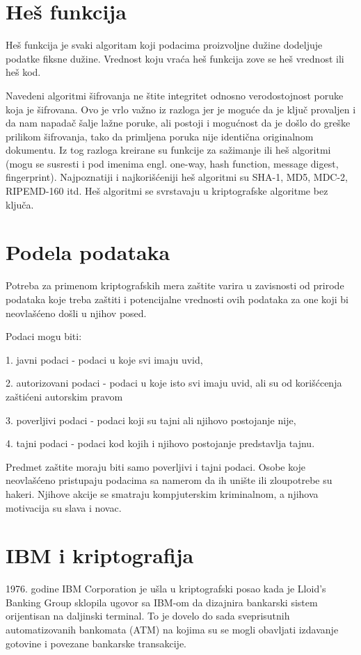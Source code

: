 \documentclass[a4paper]{article}
\begin{document}
\section{Heš funkcija}
\label{sec:heš_funkcija}
Heš funkcija je svaki algoritam koji podacima proizvoljne dužine dodeljuje podatke fiksne dužine. Vrednost koju vraća heš funkcija zove se heš vrednost ili heš kod.

Navedeni algoritmi šifrovanja ne štite integritet odnosno verodostojnost poruke koja je šifrovana. Ovo je vrlo važno iz razloga jer je moguće da je ključ provaljen i da nam napadač šalje lažne poruke, ali postoji i mogućnost da je došlo do greške prilikom šifrovanja, tako da primljena poruka nije identična originalnom dokumentu. Iz tog razloga kreirane su funkcije za sažimanje ili heš algoritmi (mogu se susresti i pod imenima engl. one-way, hash function, message digest, fingerprint). Najpoznatiji i najkorišćeniji heš algoritmi su SHA-1, MD5, MDC-2, RIPEMD-160 itd. Heš algoritmi se svrstavaju u kriptografske algoritme bez ključa.

\section{Podela podataka}
\label{sec:podela podataka}
Potreba za primenom kriptografskih mera zaštite varira u zavisnosti od prirode podataka koje treba zaštiti i potencijalne vrednosti ovih podataka za one koji bi neovlašćeno došli u njihov posed.

Podaci mogu biti:

1. javni podaci - podaci u koje svi imaju uvid,

2. autorizovani podaci - podaci u koje isto svi imaju uvid, ali su od korišćcenja zaštićeni autorskim pravom

3. poverljivi podaci - podaci koji su tajni ali njihovo postojanje nije,

4. tajni podaci - podaci kod kojih i njihovo postojanje predstavlja tajnu.

Predmet zaštite moraju biti samo poverljivi i tajni podaci. Osobe koje neovlašćeno pristupaju podacima sa namerom da ih unište ili zloupotrebe su hakeri. Njihove akcije se smatraju kompjuterskim kriminalnom, a njihova motivacija su slava i novac.

\section{IBM i kriptografija}
\label{sec:ibm_i_kriptografija}
1976. godine IBM Corporation je ušla u kriptografski posao kada je Lloid's Banking Group sklopila ugovor sa IBM-om da dizajnira bankarski sistem orijentisan na daljinski terminal. To je dovelo do sada sveprisutnih automatizovanih bankomata (ATM) na kojima su se mogli obavljati izdavanje gotovine i povezane bankarske transakcije. 
\end{document}
